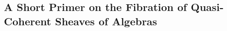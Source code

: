 \documentclass{amsart}
\newtheorem{corollary}[equation]{Corollary}
\theoremstyle{definition}
\DeclareMathOperator{\Qbb}{\mathbb{Q}}
\DeclareMathOperator{\C}{\mathbb{C}}
\DeclareMathOperator{\Adj}{\mathsf{Adj}}
\DeclareMathOperator{\op}{op}
\DeclareMathOperator{\Sch}{\mathbf{Sch}}
\DeclareMathOperator{\QCoh}{\mathbf{QCoh}}
\DeclareMathOperator{\El}{El}
\DeclareMathOperator{\pr}{pr}
\newcommand{\Kah}[2]{\Omega_{{#1}/{#2}}}
\numberwithin{equation}{subsection}
\begin{document}
%

\subsection{A Short Primer on the Fibration of Quasi-Coherent Sheaves of Algebras}\label{Subsection: QCoh CAlg}
\end{document}
